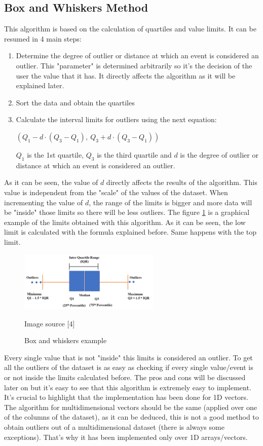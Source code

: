 \documentclass{article}
\begin{document}
\subsection{Box and Whiskers Method}
This algorithm is based on the calculation of quartiles and value limits. It can be resumed in 4 main steps:
\begin{enumerate}
    \item Determine the degree of outlier or distance at which an event is considered an outlier. This "parameter" is determined arbitrarily so it's the decision of the user the value that it has. It directly affects the algorithm as it will be explained later.
    \item Sort the data and obtain the quartiles
    \item Calculate the interval limits for outliers using the next equation:
    \begin{center}
    \(
    (Q_1 - d \cdot (Q_3 - Q_1), \: Q_3 + d \cdot (Q_3 - Q_1))
    \)
    \end{center}
    \(Q_1\) is the 1st quartile, \(Q_3\) is the third quartile and \(d\) is the degree of outlier or distance at which an event is considered an outlier.
\end{enumerate}
As it can be seen, the value of \(d\) directly affects the results of the algorithm. This value is independent from the "scale" of the values of the dataset. When incrementing the value of \(d\), the range of the limits is bigger and more data will be "inside" those limits so there will be less outliers.
The figure \ref{fig:box&whiskerslimitsexample} is a graphical example of the limits obtained with this algorithm. As it can be seen, the low limit is calculated with the formula explained before. Same happens with the top limit.
\begin{figure}
    \centering
    \includegraphics[width=0.6\textwidth]{./images/BoxAndWhiskersExample.png}
    \caption{Box and whiskers example}
    Image source \label{fig:box&whiskerslimitsexample}[4]
\end{figure}

Every single value that is not "inside" this limits is considered an outlier. To get all the outliers of the dataset is as easy as checking if every single value/event is or not inside the limits calculated before.
The pros and cons will be discussed later on but it's easy to see that this algorithm is extremely easy to implement. It's crucial to highlight that the implementation has been done for 1D vectors. The algorithm for multidimensional vectors should be the same (applied over one of the columns of the dataset), as it can be deduced, this is not a good method to obtain outliers out of a multidimensional dataset (there is always some exceptions). That's why it has been implemented only over 1D arrays/vectors.
\end{document}
